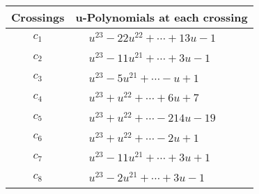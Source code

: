\documentclass[1p]{elsarticle_modified}
\theoremstyle{definition}
\begin{document}
\begin{tabular}{m{50pt}|m{274pt}}
Crossings & \hspace{64pt}u-Polynomials at each crossing \\
\hline $$\begin{aligned}c_{1}\end{aligned}$$&$\begin{aligned}
&u^{23}-22 u^{22}+\cdots+13 u-1
\end{aligned}$\\
\hline $$\begin{aligned}c_{2}\end{aligned}$$&$\begin{aligned}
&u^{23}-11 u^{21}+\cdots+3 u-1
\end{aligned}$\\
\hline $$\begin{aligned}c_{3}\end{aligned}$$&$\begin{aligned}
&u^{23}-5 u^{21}+\cdots- u+1
\end{aligned}$\\
\hline $$\begin{aligned}c_{4}\end{aligned}$$&$\begin{aligned}
&u^{23}+u^{22}+\cdots+6 u+7
\end{aligned}$\\
\hline $$\begin{aligned}c_{5}\end{aligned}$$&$\begin{aligned}
&u^{23}+u^{22}+\cdots-214 u-19
\end{aligned}$\\
\hline $$\begin{aligned}c_{6}\end{aligned}$$&$\begin{aligned}
&u^{23}+u^{22}+\cdots-2 u+1
\end{aligned}$\\
\hline $$\begin{aligned}c_{7}\end{aligned}$$&$\begin{aligned}
&u^{23}-11 u^{21}+\cdots+3 u+1
\end{aligned}$\\
\hline $$\begin{aligned}c_{8}\end{aligned}$$&$\begin{aligned}
&u^{23}-2 u^{21}+\cdots+3 u-1
\end{aligned}$\\

\end{tabular}
\end{document}
